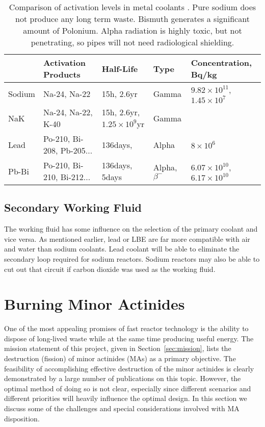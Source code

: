 \documentclass[]{report}
\begin{document}
\begin{table}[ht]
\begin{tabular}{|l|l|l|l|l|}
  \hline
          & Activation Products & Half-Life & Type & Concentration, Bq/kg\\
  \hline
  Sodium & Na-24, Na-22 & 15h, 2.6yr & Gamma & $9.82\times 10^{11}$, $1.45\times 10^7$\\ 
  NaK & Na-24, Na-22, K-40 & 15h, 2.6yr, $1.25\times10^9$yr & Gamma  &\\  %
  Lead & Po-210, Bi-208, Pb-205... & 136days, & Alpha & $8\times10^6$ \\
  Pb-Bi & Po-210, Bi-210, Bi-212... & 136days, 5days & Alpha, $\beta^-$ & $6.07\times10^{10}$, $6.17\times10^{10}$  \\
  \hline
\end{tabular}
\caption{Comparison of activation levels in metal coolants \cite{coolant_activation}. Pure sodium does not produce any long term waste. Bismuth generates a significant amount of Polonium. Alpha radiation is highly toxic, but not penetrating, so pipes will not need radiological shielding.}
\end{table}
 
\subsection{Secondary Working Fluid}
The working fluid has some influence on the selection of the primary coolant and vice versa. As mentioned earlier, lead or LBE are far more compatible with air and water than sodium coolants.  
Lead coolant will be able to eliminate the secondary loop required for sodium reactors. Sodium reactors may also be able to cut out that circuit if carbon dioxide was used as the working fluid.


\section{Burning Minor Actinides}
One of the most appealing promises of fast reactor technology is the ability to dispose of long-lived waste while at the same time producing useful energy.
The mission statement of this project, given in Section~\ref{sec:mission}, lists the destruction (fission) of minor actinides (MAs) as a primary objective.
The feasibility of accomplishing effective destruction of the minor actinides is clearly demonstrated by a large number of publications on this topic. However, the optimal method of doing so is not clear, especially since different scenarios and different priorities will heavily influence the optimal design.
In this section we discuss some of the challenges and special considerations involved with MA disposition.
\end{document}

